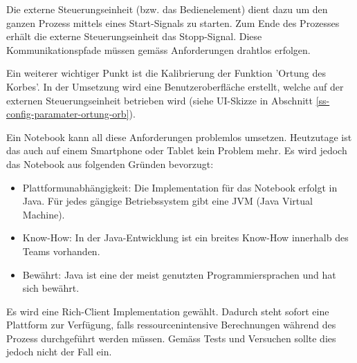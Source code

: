 Die externe Steuerungseinheit (bzw. das Bedienelement) dient dazu um den ganzen Prozess mittels eines Start-Signals zu starten. Zum Ende des Prozesses erhält die externe Steuerungseinheit das Stopp-Signal. Diese Kommunikationspfade müssen gemäss Anforderungen drahtlos erfolgen.

Ein weiterer wichtiger Punkt ist die Kalibrierung der Funktion 'Ortung des Korbes'. In der Umsetzung wird eine Benutzeroberfläche erstellt, welche auf der externen Steuerungseinheit betrieben wird (siehe UI-Skizze in Abschnitt \ref{ss-config-paramater-ortung-orb}).

Ein Notebook kann all diese Anforderungen problemlos umsetzen. Heutzutage ist das auch auf einem Smartphone oder Tablet kein Problem mehr. Es wird jedoch das Notebook aus folgenden Gründen bevorzugt:

\begin{itemize}
	\item Plattformunabhängigkeit: Die Implementation für das Notebook erfolgt in Java. Für jedes gängige Betriebssystem gibt eine JVM (Java Virtual Machine).
	\item Know-How: In der Java-Entwicklung ist ein breites Know-How innerhalb des Teams vorhanden.
	\item Bewährt: Java ist eine der meist genutzten Programmiersprachen und hat sich bewährt.
\end{itemize}

Es wird eine Rich-Client Implementation gewählt. Dadurch steht sofort eine Plattform zur Verfügung, falls ressourcenintensive Berechnungen während des Prozess durchgeführt werden müssen. Gemäss Tests und Versuchen sollte dies jedoch nicht der Fall ein.



